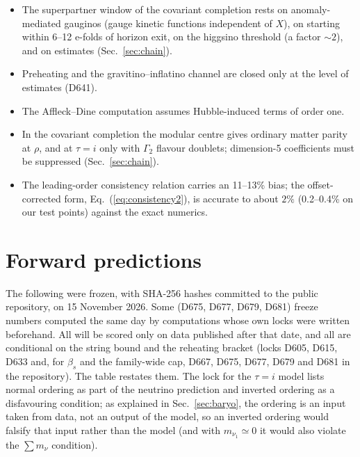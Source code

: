 \documentclass[aps,prd,twocolumn,superscriptaddress,nofootinbib,floatfix]{revtex4-2}
\begin{document}
\begin{itemize}
\item The superpartner window of the covariant completion rests on anomaly-mediated gauginos (gauge kinetic functions independent of $X$), on starting within 6--12 e-folds of horizon exit, on the higgsino threshold (a factor $\sim2$), and on estimates (Sec.~\ref{sec:chain}).
\item Preheating and the gravitino--inflatino channel are closed only at the level of estimates (D641).
\item The Affleck--Dine computation assumes Hubble-induced terms of order one.
\item In the covariant completion the modular centre gives ordinary matter parity at $\rho$, and at $\tau=i$ only with $\Gamma_2$ flavour doublets; dimension-5 coefficients must be suppressed (Sec.~\ref{sec:chain}).
\item The leading-order consistency relation carries an 11--13\% bias; the offset-corrected form, Eq.~(\ref{eq:consistency2}), is accurate to about $2\%$ (0.2--0.4\% on our test points) against the exact numerics.
\end{itemize}

\section{Forward predictions}\label{sec:forward}
The following were frozen, with SHA-256 hashes committed to the public repository, on 15 November 2026. Some (D675, D677, D679, D681) freeze numbers computed the same day by computations whose own locks were written beforehand. All will be scored only on data published after that date, and all are conditional on the string bound and the reheating bracket (locks D605, D615, D633 and, for $\beta_s$ and the family-wide cap, D667, D675, D677, D679 and D681 in the repository). The table restates them. The lock for the $\tau=i$ model lists normal ordering as part of the neutrino prediction and inverted ordering as a disfavouring condition; as explained in Sec.~\ref{sec:baryo}, the ordering is an input taken from data, not an output of the model, so an inverted ordering would falsify that input rather than the model (and with $m_{\nu_1}\simeq0$ it would also violate the $\sum m_\nu$ condition).
\end{document}
